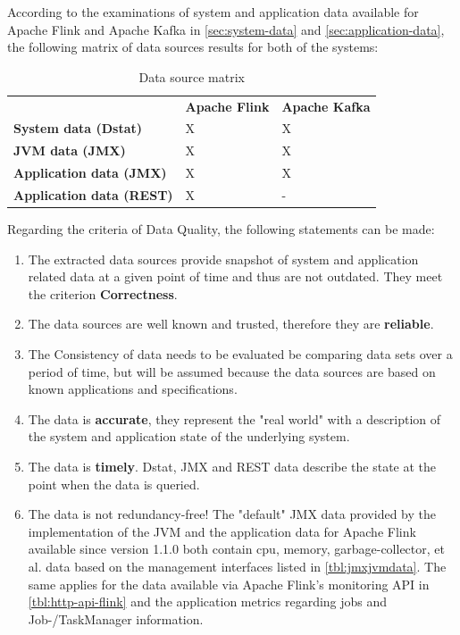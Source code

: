 According to the examinations of system and application data available for Apache Flink and Apache Kafka in
\autoref{sec:system-data} and \autoref{sec:application-data}, the following matrix of data sources results
for both of the systems:

\begin{table}[H]
\begin{tabular}{lll}
 & \textbf{Apache Flink} & \textbf{Apache Kafka} \\
\textbf{System data (Dstat)} & X & X \\
\textbf{JVM data (JMX)} & X & X \\
\textbf{Application data (JMX)} & X & X \\
\textbf{Application data (REST)} & X & - \\
\end{tabular}
\caption{Data source matrix}
\label{tbl:data-source-matrix}
\end{table}

Regarding the criteria of Data Quality, the following statements can be made:

\begin{enumerate}
    \item The extracted data sources provide snapshot of system and application related data at a
    given point of time and thus are not outdated. They meet the criterion \textbf{Correctness}.
    \item The data sources are well known and trusted, therefore they are \textbf{reliable}.
    \item The Consistency of data needs to be evaluated be comparing data sets over a period of time,
    but will be assumed because the data sources are based on known applications and specifications.
    \item The data is \textbf{accurate}, they represent the "real world" with a description of the system and application
    state of the underlying system.
    \item The data is \textbf{timely}. Dstat, JMX and REST data describe the state at the point when the data is
    queried.
    \item The data is not redundancy-free! The "default" JMX data provided by the implementation of the JVM and the
    application data for Apache Flink available since version 1.1.0 both contain cpu, memory, garbage-collector, et al.
    data based on the management interfaces listed in \autoref{tbl:jmxjvmdata}. The same applies for the data available
    via Apache Flink's monitoring API in \autoref{tbl:http-api-flink} and the application metrics regarding jobs and Job-/TaskManager information.
\end{enumerate}

